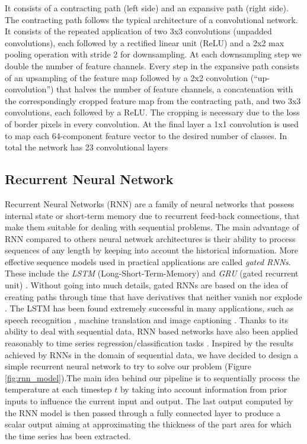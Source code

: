 It consists of a contracting path (left side) and an expansive path (right side). The contracting path follows the typical architecture of a convolutional network. It consists of the repeated application of two 3x3 convolutions (unpadded convolutions), each followed by a rectified linear unit (ReLU) and a 2x2 max pooling operation with stride 2 for downsampling. At each downsampling step we double the number of feature channels. Every step in the expansive path consists of an upsampling of the feature map followed by a 2x2 convolution (“up-convolution”) that halves the
number of feature channels, a concatenation with the correspondingly cropped feature map from the contracting path, and two 3x3 convolutions, each followed by a ReLU. The cropping is necessary due to the loss of border pixels in every convolution. At the final layer a 1x1 convolution is used to map each 64-component feature vector to the desired number of classes. In total the network
has 23 convolutional layers



\subsection{Recurrent Neural Network} \label{Recurrent Neural Network}

Recurrent Neural Networks (RNN) \citep{rumelhart1986learning} are a family of neural networks that possess internal state or short-term memory due to recurrent feed-back connections, that make them suitable for dealing with sequential problems. The main advantage of RNN compared to others neural network architectures is their ability to process sequences of any length by keeping into account the historical information. More effective sequence models used in practical applications are called \textit{gated RNNs}. These include the \textit{LSTM} (Long-Short-Term-Memory) \citep{hochreiter1997long} and \textit{GRU} (gated recurrent unit) \citep{cho2014properties}. Without going into much details, gated RNNs are based on the idea of creating paths through time that have derivatives that neither vanish nor explode \citep{goodfellow2016deep}. The LSTM has been found extremely successful in many applications, such as speech recognition \citep{graves2013hybrid}\citep{graves2014towards}, machine translation \citep{sutskever2014sequence} and image captioning \citep{kiros2014unifying}\citep{vinyals2015show}\citep{xu2015show}. Thanks to its ability to deal with sequential data, RNN based networks have also been applied reasonably to time series regression/classification tasks \citep{smirnov2018time}. Inspired by the results achieved by RNNs in the domain of sequential data, we have decided to design a simple recurrent neural network to try to solve our problem (Figure \ref{fig:rnn_model}).The main idea behind our pipeline is to sequentially process the temperature at each timestep $t$ by taking into account information from prior inputs to influence the current input and output. The last output computed by the RNN model is then passed through a fully connected layer to produce a scalar output aiming at approximating the thickness of the part area for which the time series has been extracted. 



